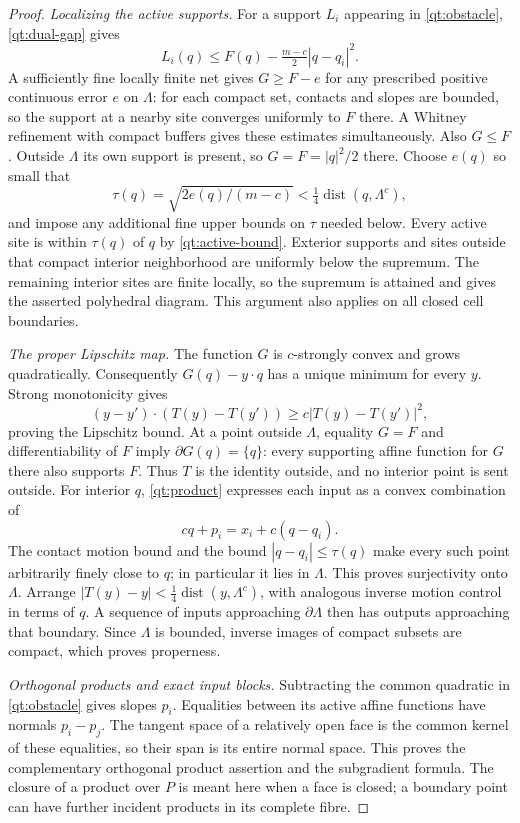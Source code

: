 \documentclass[11pt]{article}
\numberwithin{equation}{section}
\theoremstyle{definition}
\theoremstyle{remark}
\begin{document}
\begin{proof}
\emph{Localizing the active supports.}
For a support $L_i$ appearing in \eqref{qt:obstacle},
\eqref{qt:dual-gap} gives
\begin{equation}\label{qt:active-bound}
 L_i(q)\leq F(q)-\tfrac{m-c}{2}|q-q_i|^2.
\end{equation}
A sufficiently fine locally finite net gives $G\geq F-e$ for any
prescribed positive continuous error $e$ on $\Lambda$: for each compact
set, contacts and slopes are bounded, so the support at a nearby site
converges uniformly to $F$ there.  A Whitney refinement with compact
buffers gives these estimates simultaneously.  Also $G\leq F$.
Outside $\Lambda$ its own support is present, so $G=F=|q|^2/2$ there.
Choose $e(q)$ so small that
\[
 \tau(q)=\sqrt{2e(q)/(m-c)}<\tfrac14\operatorname{dist}(q,\Lambda^c),
\]
and impose any additional fine upper bounds on $\tau$ needed below.
Every active site is within $\tau(q)$ of $q$ by
\eqref{qt:active-bound}.  Exterior supports and sites outside that
compact interior neighborhood are uniformly below the supremum.
The remaining interior sites are finite locally, so the supremum is
attained and gives the asserted polyhedral diagram.  This argument
also applies on all closed cell boundaries.

\emph{The proper Lipschitz map.}
The function $G$ is $c$-strongly convex and grows quadratically.
Consequently $G(q)-y\cdot q$ has a unique minimum for every $y$.
Strong monotonicity gives
\[
 (y-y')\cdot(T(y)-T(y'))\geq c|T(y)-T(y')|^2,
\]
proving the Lipschitz bound.  At a point outside $\Lambda$, equality
$G=F$ and differentiability of $F$ imply $\partial G(q)=\{q\}$:
every supporting affine function for $G$ there also supports $F$.
Thus $T$ is the identity outside, and no interior point is sent outside.
For interior $q$, \eqref{qt:product} expresses each input as a convex
combination of
\[
 cq+p_i=x_i+c(q-q_i).
\]
The contact motion bound and the bound $|q-q_i|\leq\tau(q)$ make every
such point arbitrarily finely close to $q$; in particular it lies in
$\Lambda$.  This proves surjectivity onto $\Lambda$.  Arrange
$|T(y)-y|<\tfrac14\operatorname{dist}(y,\Lambda^c)$, with analogous inverse motion
control in terms of $q$.  A sequence of inputs approaching
$\partial\Lambda$ then has outputs approaching that boundary.  Since
$\Lambda$ is bounded, inverse images of compact subsets are compact,
which proves properness.

\emph{Orthogonal products and exact input blocks.}
Subtracting the common quadratic in \eqref{qt:obstacle} gives slopes
$p_i$.  Equalities between its active affine functions have normals
$p_i-p_j$.  The tangent space of a relatively open face is the common
kernel of these equalities, so their span is its entire normal space.
This proves the complementary orthogonal product assertion and the
subgradient formula.  The closure of a product over $P$ is meant here
when a face is closed; a boundary point can have further incident
products in its complete fibre.


\end{proof}
\end{document}
